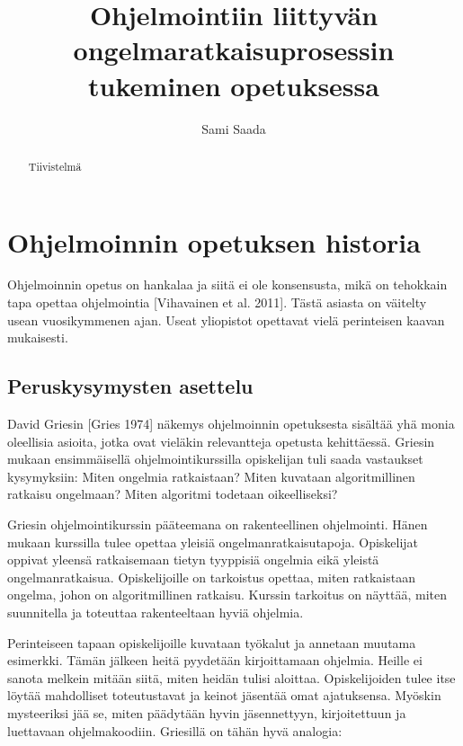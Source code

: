 \documentclass{tktltiki}
\begin{document}
\author{Sami Saada}
\title{Ohjelmointiin liittyvän ongelmaratkaisuprosessin tukeminen opetuksessa}

\maketitle

\doublespacing

\subject{Tietojenkäsittelytiede}


\begin{abstract}
Tiivistelmä
\end{abstract}

\mytableofcontents

\section{Ohjelmoinnin opetuksen historia}

Ohjelmoinnin opetus on hankalaa ja siitä ei ole konsensusta, mikä on tehokkain tapa opettaa ohjelmointia [Vihavainen et al. 2011]. Tästä asiasta on väitelty usean vuosikymmenen ajan. Useat yliopistot opettavat vielä perinteisen kaavan mukaisesti.

\subsection{Peruskysymysten asettelu}

David Griesin [Gries 1974] näkemys ohjelmoinnin opetuksesta sisältää yhä monia oleellisia asioita, jotka ovat vieläkin relevantteja opetusta kehittäessä. Griesin mukaan ensimmäisellä ohjelmointikurssilla opiskelijan tuli saada vastaukset kysymyksiin: Miten ongelmia ratkaistaan? Miten kuvataan algoritmillinen ratkaisu ongelmaan? Miten algoritmi todetaan oikeelliseksi?

Griesin ohjelmointikurssin pääteemana on rakenteellinen ohjelmointi. Hänen mukaan kurssilla tulee opettaa yleisiä ongelmanratkaisutapoja. Opiskelijat oppivat yleensä ratkaisemaan tietyn tyyppisiä ongelmia eikä yleistä ongelmanratkaisua. Opiskelijoille on tarkoistus opettaa, miten ratkaistaan ongelma, johon on algoritmillinen ratkaisu. Kurssin tarkoitus on näyttää, miten suunnitella ja toteuttaa rakenteeltaan hyviä ohjelmia.

Perinteiseen tapaan opiskelijoille kuvataan työkalut ja annetaan muutama esimerkki. Tämän jälkeen heitä pyydetään kirjoittamaan ohjelmia. Heille ei sanota melkein mitään siitä, miten heidän tulisi aloittaa. Opiskelijoiden tulee itse löytää mahdolliset toteutustavat ja keinot jäsentää omat ajatuksensa. Myöskin mysteeriksi jää se, miten päädytään hyvin jäsennettyyn, kirjoitettuun ja luettavaan ohjelmakoodiin. Griesillä on tähän hyvä analogia:
\end{document}
